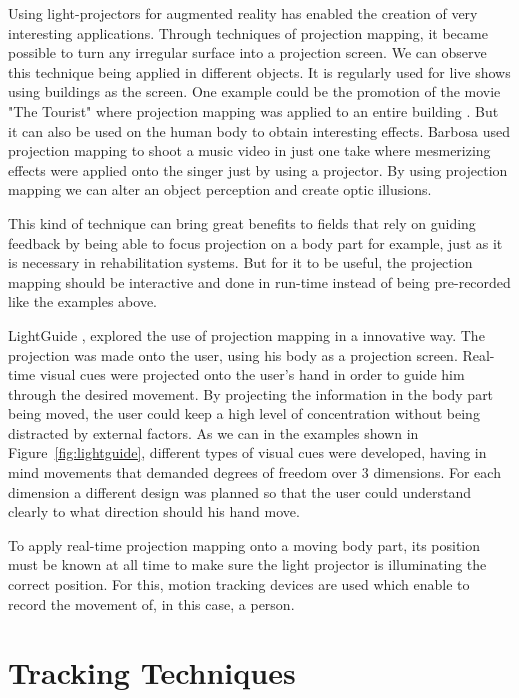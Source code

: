 Using light-projectors for augmented reality has enabled the creation of very interesting applications. 
Through techniques of projection mapping, it became possible to turn any irregular surface into a projection screen.
We can observe this technique being applied in different objects. It is regularly used for live shows 
using buildings as the screen. One example could be the promotion of the movie "The Tourist" where 
projection mapping was applied to an entire building \cite{projectionmapping_building}. But it can 
also be used on the human body to obtain interesting effects. Barbosa \cite{projectionmapping_face} 
used projection mapping to shoot a music video in just one take where mesmerizing effects were applied 
onto the singer just by using a projector. 
By using projection mapping we can alter an object perception and create optic illusions.

This kind of technique can bring great benefits to fields that rely on guiding feedback by being able 
to focus projection on a body part for example, just as it is necessary in rehabilitation systems.
But for it to be useful, the projection mapping should be interactive and done in run-time instead of 
being pre-recorded like the examples above.

LightGuide \cite{Sodhi2012}, explored the use of projection mapping in a innovative way. 
The projection was made onto the user, using his body as a projection screen. 
Real-time visual cues were projected onto the user's hand in order to guide him through the desired movement. 
By projecting the information in the body part being moved, the user could keep a high level of concentration 
without being distracted by external factors.
As we can in the examples shown in Figure~\ref{fig:lightguide}, different types of visual cues were developed, having in mind movements that demanded degrees of freedom over 3 dimensions. 
For each dimension a different design was planned so that the user could understand clearly to what direction 
should his hand move.

To apply real-time projection mapping onto a moving body part, its 
position must be known at all time to make sure the light projector is 
illuminating the correct position. 
For this, motion tracking devices are used which enable to record the movement of, in this case, a person. 

\section{Tracking Techniques} 

